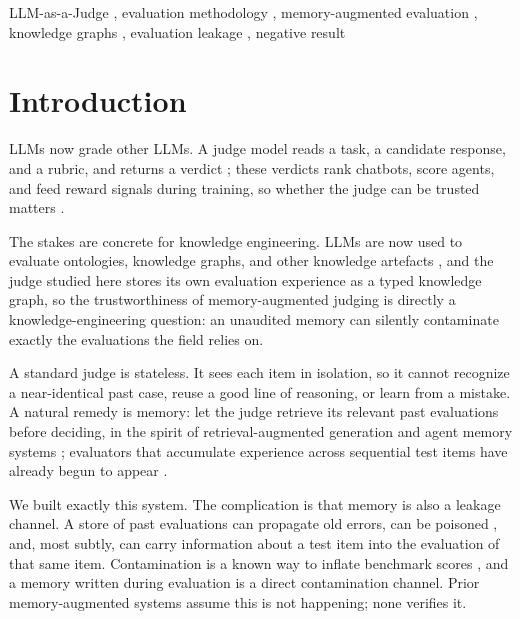 \documentclass[]{ceurart}
\begin{document}
\begin{keywords}
  LLM-as-a-Judge \sep
  evaluation methodology \sep
  memory-augmented evaluation \sep
  knowledge graphs \sep
  evaluation leakage \sep
  negative result
\end{keywords}

\maketitle

\section{Introduction}

LLMs now grade other LLMs. A judge model reads a task, a candidate response, and a rubric, and returns a verdict \citep{mt_bench2023, geval2023, judge_survey2024}; these verdicts rank chatbots, score agents, and feed reward signals during training, so whether the judge can be trusted matters \citep{chateval2023, llm_judge_agreement2024}.

The stakes are concrete for knowledge engineering. LLMs are now used to evaluate ontologies, knowledge graphs, and other knowledge artefacts \citep{hannah2025knowledge, llugiqi2025experts}, and the judge studied here stores its own evaluation experience as a typed knowledge graph, so the trustworthiness of memory-augmented judging is directly a knowledge-engineering question: an unaudited memory can silently contaminate exactly the evaluations the field relies on.

A standard judge is stateless. It sees each item in isolation, so it cannot recognize a near-identical past case, reuse a good line of reasoning, or learn from a mistake. A natural remedy is memory: let the judge retrieve its relevant past evaluations before deciding, in the spirit of retrieval-augmented generation \citep{rag_original2020} and agent memory systems \citep{memgpt2023, generative_agents2023, reflexion2023}; evaluators that accumulate experience across sequential test items have already begun to appear \citep{jwa2026experienced}.

We built exactly this system. The complication is that memory is also a leakage channel. A store of past evaluations can propagate old errors, can be poisoned \citep{rag_poisoning2024}, and, most subtly, can carry information about a test item into the evaluation of that same item. Contamination is a known way to inflate benchmark scores \citep{data_contamination2024, benchmark_contamination2024, eval_leakage2024}, and a memory written during evaluation is a direct contamination channel. Prior memory-augmented systems assume this is not happening; none verifies it.
\end{document}
